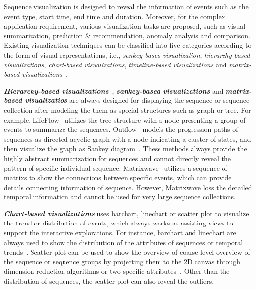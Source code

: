 Sequence visualization is designed to reveal the information of events such as the event type, start time, end time and duration. Moreover, for the complex application requirement, various visualization tasks are proposed, such as visual summarization, prediction $\&$ recommendation, anomaly analysis and comparison. Existing visualization techniques can be classified into five categories according to the form of visual representations, i.e., \emph{sankey-based visualization}, \emph{hierarchy-based visualizations}, \emph{chart-based visualizations}, \emph{timeline-based visualizations} and \emph{matrix-based visualizations}~\cite{guo2020survey}. 

\emph{\textbf{Hierarchy-based visualizations}}~\cite{gotz2019visual}, \emph{\textbf{sankey-based visualizations}} and \emph{\textbf{matrix-based visualizatios}} are always designed for displaying the sequence or sequence collection after modeling the them as special structures such as graph or tree.
For example, LifeFlow~\cite{wongsuphasawat2011lifeflow} utilizes the tree structure with a node presenting a group of events to summarize the sequences. Outflow~\cite{wongsuphasawat2011outflow} models the progression paths of sequences as directed acyclic graph with a node indicating a cluster of states, and then visualize the graph as Sankey diagram~\cite{riehmann2005interactive}.  These methods always provide the highly abstract summarization for sequences and cannot directly reveal the pattern of specific individual sequence. Matrixwave~\cite{zhao2015matrixwave} utilizes a sequence of matrixs to show the connections between specific events, which can provide details connecting information of sequence. However, Matrixwave loss the detailed temporal information and cannot be used for very large sequence collections. 

\emph{\textbf{Chart-based visualizations}} uses barchart, linechart or scatter plot to visualize the trend or distribution of events, which always works as assisting views to support the interactive explorations. For instance, barchart and linechart are always used to show the distribution of the attributes of sequences or temporal trends~\cite{gotz2019visual, cappers2017exploring}. Scatter plot can be used to show the overview of coarse-level overview of the sequence or sequence groups by projecting them to the 2D canvas through dimension reduction algorithms or two specific attributes~\cite{wu2020visual, malik2016high, gotz2019visual}. Other than the distribution of sequences, the scatter plot can also reveal the outliers. 

